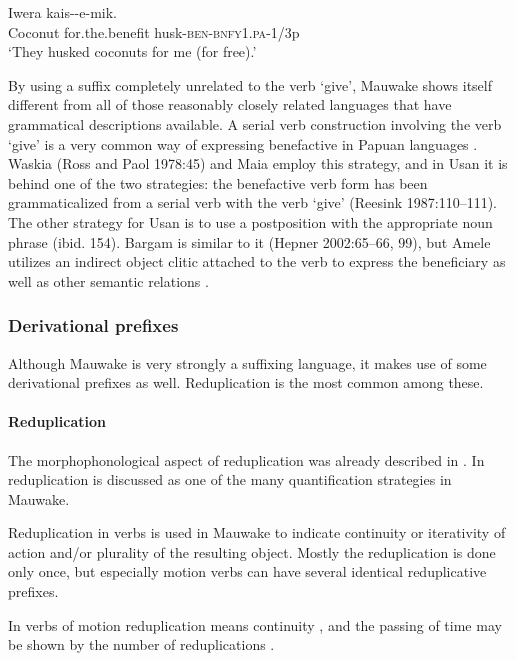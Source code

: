 \ea%
\label{ex:3:x215}
\gll Iwera  kais--e-mik. \\
Coconut for.the.benefit husk-\textsc{ben}-\textsc{bnfy}1.\textsc{pa}-1/3p \\
\glt`They husked coconuts for me (for free).'
\z

By using a suffix completely unrelated to the verb `give', Mauwake shows itself different from all of those reasonably closely related languages that have grammatical descriptions available. A serial verb construction involving the verb `give' is a very common way of expressing benefactive in Papuan languages \citep[141]{Foley1986}. Waskia ({Ross and Paol 1978}:45) and Maia \citep[125]{Hardin2002} employ this strategy, and in Usan it is behind one of the two strategies: the benefactive verb form has been grammaticalized from a serial verb with the verb `give' ({Reesink 1987}:110--111). The other strategy for Usan is to use a postposition with the appropriate noun phrase (ibid. 154). Bargam is similar to it ({Hepner 2002}:65--66, 99), but Amele utilizes an indirect object clitic attached to the verb to express the beneficiary as well as other semantic relations \citep[167]{Roberts1987}. 

\subsubsection{Derivational prefixes}\label{sec:3:z:y:x}
{}
Although Mauwake is very strongly a suffixing language, it makes use of some derivational prefixes as well. Reduplication is the most common among these. 

\paragraph{Reduplication}\label{sec:3:a:z:y:x}
{}
The morphophonological aspect of reduplication was already described in . In  reduplication is discussed as one of the many quantification strategies in Mauwake.

Reduplication in verbs is used in Mauwake to indicate continuity or iterativity of action and/or plurality of the resulting object. Mostly the reduplication is done only once, but especially motion verbs can have several identical reduplicative prefixes. 

In verbs of motion reduplication means continuity , and the passing of time may be shown by the number of reduplications .

